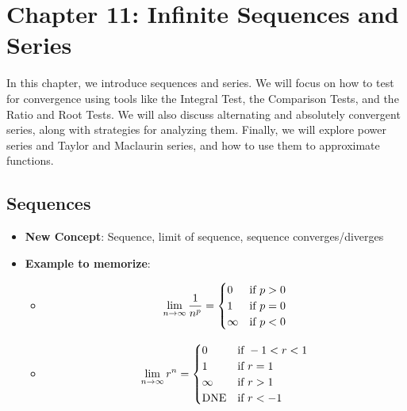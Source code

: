 \section{Chapter 11: Infinite Sequences and Series} 
In this chapter, we introduce sequences and series. We will focus on how to test for convergence using tools like the Integral Test, the Comparison Tests, and the Ratio and Root Tests. We will also discuss alternating and absolutely convergent series, along with strategies for analyzing them. Finally, we will explore power series and Taylor and Maclaurin series, and how to use them to approximate functions.

\subsection{Sequences} 
\begin{center}
\begin{tcolorbox}
    \begin{itemize}
        \item \textbf{New Concept}: Sequence, limit of sequence, sequence converges/diverges 
        \item \textbf{Example to memorize}:
        \begin{itemize}
        \item \begin{align*}
            \displaystyle\lim_{n \to \infty} \dfrac{1}{n^p} = \begin{cases} 
            0 & \text{if } p > 0 \\
            1 & \text{if } p = 0 \\
            \infty & \text{if } p < 0
        \end{cases}
        \end{align*}
        
        \item \begin{align*}
                \displaystyle\lim_{n \to \infty} r^n = \begin{cases} 
            0 & \text{if } -1 < r < 1 \\
            1 & \text{if } r = 1 \\
            \infty & \text{if } r > 1 \\
            \text{DNE} & \text{if } r < -1
            \end{cases}
        \end{align*}
        \end{itemize}
    \end{itemize}
\end{tcolorbox}
\end{center}


